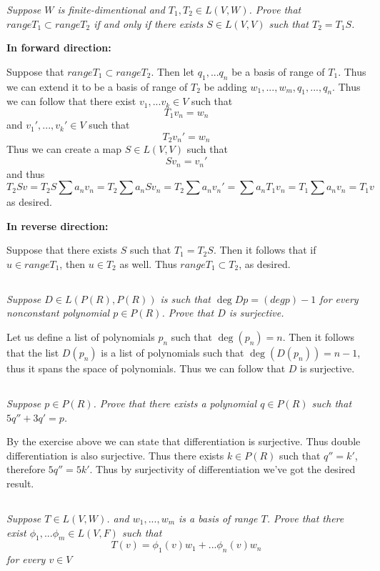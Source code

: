 \documentclass[11pt,oneside,titlepage]{book}
\begin{document}
\textit{Suppose $W$ is finite-dimentional and $T_1, T_2 \in L(V, W)$. Prove that
  $range T_1 \subset range T_2$ if and only if there exists $S \in L(V, V)$ such that
  $T_2 = T_1S $.}

\textbf{In forward direction:}

Suppose that $range T_1 \subset range T_2$. Then let $q_1, ... q_n$ be a basis of range of $T_1$.
Thus we can extend it to be a basis of range of $T_2$ be adding $w_1, ..., w_m, q_1, ..., q_n$.
Thus we can follow that there exist $v_1, ... v_k \in V$ such that
$$T_1 v_n = w_n$$
and $v_1', ..., v_k' \in V$ such that
$$T_2 v_n' = w_n$$
Thus we can create a map $S \in L(V, V)$ such that
$$S v_n = v_n'$$
and thus
$$T_2 S v = T_2 S \sum a_n v_n = T_2  \sum a_n S v_n = T_2  \sum a_n  v_n'  = \sum a_n T_1 v_n 
=T_1 \sum a_n  v_n = T_1 v$$
as desired.

\textbf{In reverse direction: }

Suppose that there exists $S$ such that $T_1 = T_2 S$. Then it follows that if $u \in range T_1$,
then $u \in T_2$ as well. Thus $range T_1 \subset T_2$, as desired.


\subsection{}

\textit{Suppose $D \in L(P(R), P(R))$ is such that $\deg Dp = (deg p) -1$ for every nonconstant
  polynomial $p \in P(R)$. Prove that $D$ is surjective.}

Let us define a list of polynomials $p_n$ such that $\deg(p_n) = n$. Then it follows that
the list $D(p_n)$ is a list of polynomials such that $\deg (D(p_n)) = n - 1$, thus it
spans the space of polynomials. Thus we can follow that $D$ is surjective.

\subsection{}
\textit{Suppose $p \in P(R)$. Prove that there exists a polynomial $q \in P(R)$ such that
  $5q'' + 3q' = p$.}

By the exercise above we can state that differentiation is surjective. Thus double differentiation
is also surjective. Thus there exists $k \in P(R)$ such that $q'' = k'$, therefore
$5q'' = 5k'$. Thus by surjectivity of differentiation we've got the desired result.

\subsection{}
\textit{Suppose $T \in L(V, W)$. and $w_1, ..., w_m$ is a basis of range $T$. Prove that there
  exist $\phi_1, ... \phi_m \in L(V, F)$ such that }
$$T(v) = \phi_1(v) w_1 + ... \phi_n(v) w_n$$
\textit{for every $v \in V$}
\end{document}
